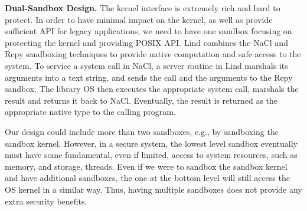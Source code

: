 \textbf{Dual-Sandbox Design.}
The kernel interface is extremely rich and hard to protect.
In order to have minimal impact on the kernel, as well as provide sufficient API for legacy applications,
we need to have one sandbox focusing on protecting the kernel and providing POSIX API.
Lind combines the NaCl and Repy sandboxing techniques to provide native computation and
safe access to the system.
%
To service a system call in NaCl, a server routine in Lind marshals its arguments into a text string,
and sends the call and the arguments to the Repy sandbox.
The library OS then executes the appropriate system call, marshals the result and
returns it back to NaCl. Eventually, the result is returned as the appropriate native type to the calling program.




Our design could include more than two sandboxes, e.g., by sandboxing the sandbox
kernel. However, in a secure system,
the lowest level sandbox eventually must have some fundamental,
even if limited, access to system resources, such as memory, and storage, threads.
Even if we were to sandbox the sandbox kernel and have additional sandboxes,
the one at the bottom level will still access the OS kernel in a similar way.
Thus, having multiple sandboxes does not provide any extra security benefits.

